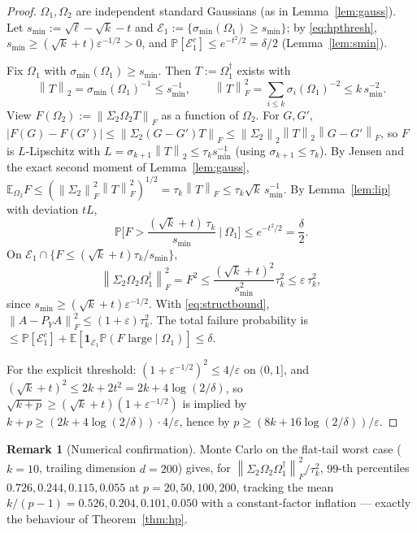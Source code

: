 \documentclass{amsart}
\theoremstyle{definition}
\newtheorem{remark}{Remark}
\newcommand{\Frob}[1]{\left\lVert #1\right\rVert_F}
\newcommand{\Op}[1]{\left\lVert #1\right\rVert_2}
\newcommand{\E}{\mathbb{E}}
\newcommand{\Prob}{\mathbb{P}}
\begin{document}
\begin{proof}
$\Omega_1,\Omega_2$ are independent standard Gaussians (as in
Lemma~\ref{lem:gauss}). Let $s_{\min}:=\sqrt\ell-\sqrt k-t$ and
$\mathcal E_1:=\{\sigma_{\min}(\Omega_1)\ge s_{\min}\}$; by \eqref{eq:hpthresh},
$s_{\min}\ge(\sqrt k+t)\varepsilon^{-1/2}>0$, and
$\Prob[\mathcal E_1^c]\le e^{-t^2/2}=\delta/2$ (Lemma~\ref{lem:smin}).

Fix $\Omega_1$ with $\sigma_{\min}(\Omega_1)\ge s_{\min}$. Then $T:=\Omega_1^\dagger$
exists with
\begin{equation}\label{eq:Tnorms}
\Op{T}=\sigma_{\min}(\Omega_1)^{-1}\le s_{\min}^{-1},
\qquad
\Frob{T}^2=\sum_{i\le k}\sigma_i(\Omega_1)^{-2}\le k\,s_{\min}^{-2}.
\end{equation}
View $F(\Omega_2):=\Frob{\Sigma_2\Omega_2 T}$ as a function of $\Omega_2$. For
$G,G'$, $|F(G)-F(G')|\le\Frob{\Sigma_2(G-G')T}\le\Op{\Sigma_2}\Op T\Frob{G-G'}$,
so $F$ is $L$-Lipschitz with $L=\sigma_{k+1}\Op T\le\tau_k s_{\min}^{-1}$
(using $\sigma_{k+1}\le\tau_k$). By Jensen and the exact second moment of
Lemma~\ref{lem:gauss}, $\E_{\Omega_2}F\le(\Frob{\Sigma_2}^2\Frob T^2)^{1/2}
=\tau_k\Frob T\le\tau_k\sqrt k\,s_{\min}^{-1}$. By Lemma~\ref{lem:lip} with
deviation $tL$,
\[
\Prob\Big[F>\frac{(\sqrt k+t)\,\tau_k}{s_{\min}}\ \Big|\ \Omega_1\Big]
\le e^{-t^2/2}=\frac\delta2 .
\]
On $\mathcal E_1\cap\{F\le(\sqrt k+t)\tau_k/s_{\min}\}$,
\[
\Frob{\Sigma_2\Omega_2\Omega_1^\dagger}^2=F^2\le\frac{(\sqrt k+t)^2}{s_{\min}^2}\tau_k^2
\le\varepsilon\,\tau_k^2,
\]
since $s_{\min}\ge(\sqrt k+t)\varepsilon^{-1/2}$. With \eqref{eq:structbound},
$\Frob{A-P_YA}^2\le(1+\varepsilon)\tau_k^2$. The total failure probability is
$\le\Prob[\mathcal E_1^c]+\E[\mathbf1_{\mathcal E_1}\Prob(F\text{ large}\mid\Omega_1)]
\le\delta$.

For the explicit threshold: $(1+\varepsilon^{-1/2})^2\le4/\varepsilon$ on
$(0,1]$, and $(\sqrt k+t)^2\le2k+2t^2=2k+4\log(2/\delta)$, so
$\sqrt{k+p}\ge(\sqrt k+t)(1+\varepsilon^{-1/2})$ is implied by
$k+p\ge(2k+4\log(2/\delta))\cdot4/\varepsilon$, hence by
$p\ge(8k+16\log(2/\delta))/\varepsilon$.
\end{proof}

\begin{remark}[Numerical confirmation]\label{rem:hpnum}
Monte Carlo on the flat-tail worst case ($k=10$, trailing dimension $d=200$)
gives, for $\Frob{\Sigma_2\Omega_2\Omega_1^\dagger}^2/\tau_k^2$, $99$-th
percentiles $0.726,0.244,0.115,0.055$ at $p=20,50,100,200$, tracking the mean
$k/(p-1)=0.526,0.204,0.101,0.050$ with a constant-factor inflation --- exactly
the behaviour of Theorem~\ref{thm:hp}.
\end{remark}
\end{document}
